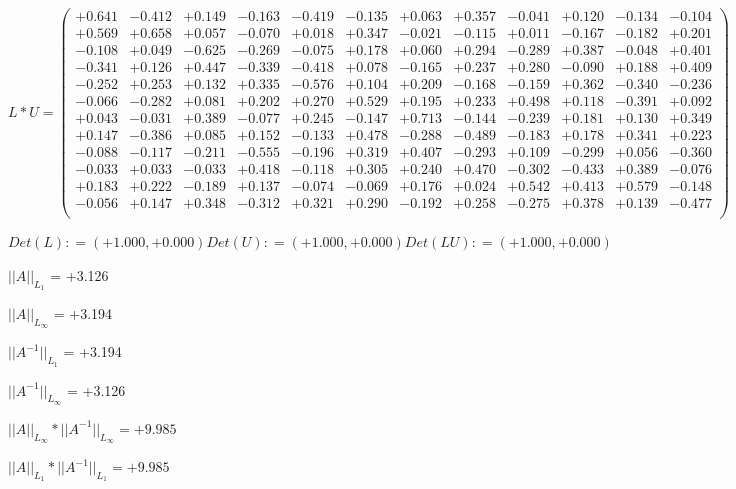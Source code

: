 \documentclass[9pt]{article}
\theoremstyle{plain}
\theoremstyle{definition}
\theoremstyle{remark}
\numberwithin{equation}{section}
\begin{document}
$L * U  = \left(
\begin{array}{
cccccccccccc}
+0.641 & -0.412 & +0.149 & -0.163 & -0.419 & -0.135 & +0.063 & +0.357 & -0.041 & +0.120 & -0.134 & -0.104 \\
+0.569 & +0.658 & +0.057 & -0.070 & +0.018 & +0.347 & -0.021 & -0.115 & +0.011 & -0.167 & -0.182 & +0.201 \\
-0.108 & +0.049 & -0.625 & -0.269 & -0.075 & +0.178 & +0.060 & +0.294 & -0.289 & +0.387 & -0.048 & +0.401 \\
-0.341 & +0.126 & +0.447 & -0.339 & -0.418 & +0.078 & -0.165 & +0.237 & +0.280 & -0.090 & +0.188 & +0.409 \\
-0.252 & +0.253 & +0.132 & +0.335 & -0.576 & +0.104 & +0.209 & -0.168 & -0.159 & +0.362 & -0.340 & -0.236 \\
-0.066 & -0.282 & +0.081 & +0.202 & +0.270 & +0.529 & +0.195 & +0.233 & +0.498 & +0.118 & -0.391 & +0.092 \\
+0.043 & -0.031 & +0.389 & -0.077 & +0.245 & -0.147 & +0.713 & -0.144 & -0.239 & +0.181 & +0.130 & +0.349 \\
+0.147 & -0.386 & +0.085 & +0.152 & -0.133 & +0.478 & -0.288 & -0.489 & -0.183 & +0.178 & +0.341 & +0.223 \\
-0.088 & -0.117 & -0.211 & -0.555 & -0.196 & +0.319 & +0.407 & -0.293 & +0.109 & -0.299 & +0.056 & -0.360 \\
-0.033 & +0.033 & -0.033 & +0.418 & -0.118 & +0.305 & +0.240 & +0.470 & -0.302 & -0.433 & +0.389 & -0.076 \\
+0.183 & +0.222 & -0.189 & +0.137 & -0.074 & -0.069 & +0.176 & +0.024 & +0.542 & +0.413 & +0.579 & -0.148 \\
-0.056 & +0.147 & +0.348 & -0.312 & +0.321 & +0.290 & -0.192 & +0.258 & -0.275 & +0.378 & +0.139 & -0.477 \\
\end{array}
\right)$ \newline 

$Det(L) :    = (+1.000,+0.000)     Det(U) :    = (+1.000,+0.000)     Det(LU) :    = (+1.000,+0.000)$

$||A||_{L_1}$  = +3.126

$||A||_{L_{\infty}}$ = +3.194

$||A^{-1}||_{L_1}$  = +3.194

$||A^{-1}||_{L_{\infty}}$ = +3.126

$||A||_{L_{\infty}} * ||A^{-1}||_{L_{\infty}} = +9.985$

$||A||_{L_1} * ||A^{-1}||_{L_1} = +9.985$
\end{document}
